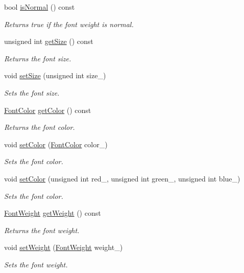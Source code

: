 \begin{CompactItemize}
bool \hyperlink{class_style_db2cbc7ca50b2f5c632c8e9b0420044c}{isNormal} () const 
\begin{CompactList}\small\item\em Returns true if the font weight is normal. \item\end{CompactList}\item 
unsigned int \hyperlink{class_style_9356c4a5d30f4e0f5c86f8c8b3f36cd2}{getSize} () const 
\begin{CompactList}\small\item\em Returns the font size. \item\end{CompactList}\item 
void \hyperlink{class_style_b5044902245b464966c13ed6daccb4f3}{setSize} (unsigned int size\_\-)
\begin{CompactList}\small\item\em Sets the font size. \item\end{CompactList}\item 
\hyperlink{struct_font_color}{FontColor} \hyperlink{class_style_2ddce056a39c4463bd952d0590b85c6b}{getColor} () const 
\begin{CompactList}\small\item\em Returns the font color. \item\end{CompactList}\item 
void \hyperlink{class_style_0f9befe0f1b7956339d7068ebc024b9c}{setColor} (\hyperlink{struct_font_color}{FontColor} color\_\-)
\begin{CompactList}\small\item\em Sets the font color. \item\end{CompactList}\item 
void \hyperlink{class_style_4f2df0b03c03b39036732a51716305a0}{setColor} (unsigned int red\_\-, unsigned int green\_\-, unsigned int blue\_\-)
\begin{CompactList}\small\item\em Sets the font color. \item\end{CompactList}\item 
\hyperlink{_font_weight_8h_ecff23ba4a68486421bcea57e095fe66}{FontWeight} \hyperlink{class_style_5798e7a57bb2df5e37aa0cdc5606a8b3}{getWeight} () const 
\begin{CompactList}\small\item\em Returns the font weight. \item\end{CompactList}\item 
void \hyperlink{class_style_75f1eaa59c2aff7c52df467c0d9157b1}{setWeight} (\hyperlink{_font_weight_8h_ecff23ba4a68486421bcea57e095fe66}{FontWeight} weight\_\-)
\begin{CompactList}\small\item\em Sets the font weight. \item\end{CompactList}\end{CompactItemize}
